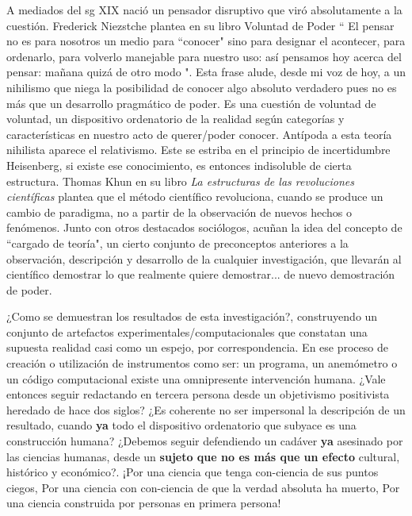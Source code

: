 A mediados del sg XIX nació un pensador disruptivo que viró absolutamente a la cuestión. Frederick Niezstche plantea en su libro Voluntad de Poder \cite{nietzsche2018voluntad} `` El pensar no es para nosotros un medio para ``conocer" sino para designar el acontecer, para ordenarlo, para volverlo manejable para nuestro uso: así pensamos hoy acerca del pensar: mañana quizá de otro modo ". Esta frase alude, desde mi voz de hoy, a un nihilismo que niega la posibilidad de conocer algo absoluto verdadero pues no es más que un desarrollo pragmático de poder. Es una cuestión de voluntad de voluntad, un dispositivo ordenatorio de la realidad según categorías y características en nuestro acto de querer/poder conocer. Antípoda a esta teoría nihilista aparece el relativismo. Este se estriba en el principio de incertidumbre Heisenberg, si existe ese conocimiento, es entonces indisoluble de cierta estructura. Thomas Khun en su libro \emph{La estructuras de las revoluciones científicas} \cite{kuhn2019estructura} plantea que el método científico revoluciona, cuando se produce un cambio de paradigma, no a partir de la observación de nuevos hechos o fenómenos. Junto con otros destacados sociólogos, acuñan la idea del concepto de ``cargado de teoría", un cierto conjunto de preconceptos anteriores a la observación, descripción y desarrollo de la cualquier investigación, que llevarán al científico demostrar lo que realmente quiere demostrar... de nuevo demostración de poder.

¿Como se demuestran los resultados de esta investigación?, construyendo un conjunto de artefactos experimentales/computacionales que constatan una supuesta realidad casi como un espejo, por correspondencia. En ese proceso de creación o utilización de instrumentos como ser: un programa, un anemómetro o un código computacional existe una omnipresente intervención humana. ¿Vale entonces seguir redactando en tercera persona desde un objetivismo positivista heredado de hace dos siglos? ¿Es coherente no ser impersonal la descripción de un resultado, cuando \textbf{ya} todo el dispositivo ordenatorio que subyace es una construcción humana? ¿Debemos seguir defendiendo un cadáver \textbf{ya} asesinado por las ciencias humanas, desde un \textbf{sujeto que no es más que un efecto} cultural, histórico y económico?. ¡Por una ciencia que tenga con-ciencia de sus puntos ciegos, Por una ciencia con con-ciencia de que la verdad absoluta ha muerto, Por una ciencia construida por personas en primera persona!  


